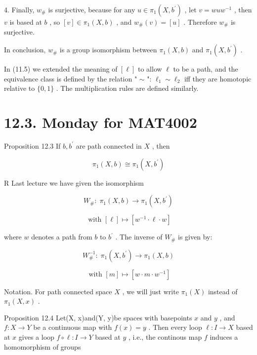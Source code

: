4. Finally, \({w}_{\# }\) is surjective, because for any \(u \in  {\pi }_{1}\left( {X,{b}^{\prime }}\right)\) , let \(v = {wu}{w}^{-1}\) , then \(v\) is based at \(b\) , so \(\left\lbrack  v\right\rbrack   \in  {\pi }_{1}\left( {X,b}\right)\) , and \({w}_{\# }\left( v\right)  = \left\lbrack  u\right\rbrack\) . Therefore \({w}_{\# }\) is surjective.

In conclusion, \({w}_{\# }\) is a group isomorphism between \({\pi }_{1}\left( {X,b}\right)\) and \({\pi }_{1}\left( {X,{b}^{\prime }}\right)\) .

In (11.5) we extended the meaning of \(\left\lbrack  \ell \right\rbrack\) to allow \(\ell\) to be a path, and the equivalence class is defined by the relation " \(\sim\) ": \({\ell }_{1} \sim  {\ell }_{2}\) iff they are homotopic relative to \(\{ 0,1\}\) . The multiplication rules are defined similarly.

\section*{12.3. Monday for MAT4002}

Proposition 12.3 If \(b,{b}^{\prime }\) are path connected in \(X\) , then

\[
{\pi }_{1}\left( {X,b}\right)  \cong  {\pi }_{1}\left( {X,{b}^{\prime }}\right)
\]

R Last lecture we have given the isomorphism

\[
{W}_{\# } : \;{\pi }_{1}\left( {X,b}\right)  \rightarrow  {\pi }_{1}\left( {X,{b}^{\prime }}\right)
\]

\[
\text{ with }\left\lbrack  \ell \right\rbrack   \mapsto  \left\lbrack  {{w}^{-1} \cdot  \ell  \cdot  w}\right\rbrack
\]

where \(w\) denotes a path from \(b\) to \({b}^{\prime }\) . The inverse of \({W}_{\# }\) is given by:

\[
{W}_{\# }^{-1} : \;{\pi }_{1}\left( {X,{b}^{\prime }}\right)  \rightarrow  {\pi }_{1}\left( {X,b}\right)
\]

\[
\text{ with }\left\lbrack  m\right\rbrack   \mapsto  \left\lbrack  {w \cdot  m \cdot  {w}^{-1}}\right\rbrack
\]

Notation. For path connected space \(X\) , we will just write \({\pi }_{1}\left( X\right)\) instead of \({\pi }_{1}\left( {X,x}\right)\) .

Proposition 12.4 Let(X, x)and(Y, y)be spaces with basepoints \(x\) and \(y\) , and \(f : X \rightarrow  Y\) be a continuous map with \(f\left( x\right)  = y\) . Then every loop \(\ell  : I \rightarrow  X\) based at \(x\) gives a loop \(f \circ  \ell  : I \rightarrow  Y\) based at \(y\) , i.e., the continous map \(f\) induces a homomorphism of groups

